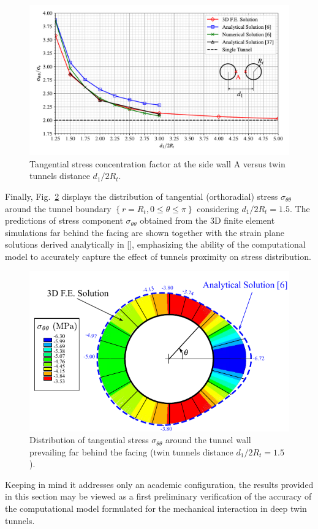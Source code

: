 \documentclass[a4paper,fleqn]{cas-sc}
\begin{document}
\begin{figure}[h!]
	\centering
	\includegraphics[scale=0.65]{Tangencial stress concentration factor in A.pdf}
	\caption{Tangential stress concentration factor at the side wall A versus twin tunnels distance $d_1/2R_t$.}
	\label{Tangencial stress concentration factor in A}
\end{figure}
\FloatBarrier

Finally, Fig.~\ref{GUO_FIG1} displays the distribution of tangential (orthoradial) stress $\sigma_{\theta \theta}$ around the tunnel boundary $\left\{r = R_t, 0 \le \theta \le \pi\right\}$ considering $d_1/2R_t = 1.5$. The predictions of stress component $\sigma_{\theta \theta}$ obtained from the 3D finite element simulations far behind the facing are shown together with the strain plane solutions derived analytically in [], emphasizing the ability of the computational model to accurately capture the effect of tunnels proximity on stress distribution.

\begin{figure}[h!]
	\centering
	\includegraphics[scale=1]{GUO_FIG1.pdf}
	\caption{Distribution of tangential stress $\sigma_{\theta \theta}$ around the tunnel wall  prevailing far behind the facing (twin tunnels distance $d_1/2R_t = 1.5$).}
	\label{GUO_FIG1}
\end{figure}
\FloatBarrier
Keeping in mind it addresses only an academic configuration, the results provided in this section may be viewed as a first preliminary verification of the accuracy of the computational model formulated for the mechanical interaction in deep twin tunnels.
\end{document}
